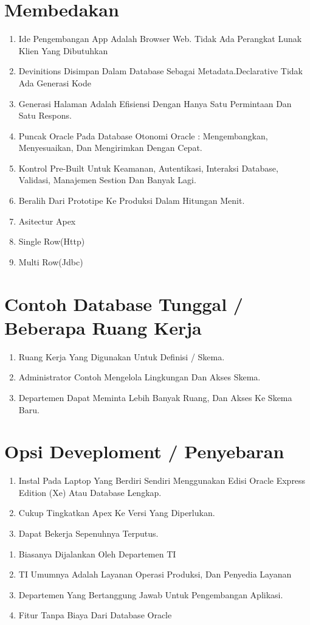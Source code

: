 \documentclass{article}
\begin{document}
\section{Membedakan}
\usepackage{Ciri:}
\begin{enumerate}
    \item Ide Pengembangan App Adalah Browser Web. Tidak Ada Perangkat Lunak Klien Yang Dibutuhkan
\item Devinitions Disimpan Dalam Database Sebagai Metadata.Declarative Tidak Ada Generasi Kode
\item Generasi Halaman Adalah Efisiensi Dengan Hanya Satu Permintaan Dan Satu Respons.
\item Puncak Oracle Pada Database Otonomi Oracle : Mengembangkan, Menyesuaikan, Dan Mengirimkan Dengan Cepat.
\item Kontrol Pre-Built Untuk Keamanan, Autentikasi, Interaksi Database, Validasi, Manajemen Sestion Dan Banyak Lagi.
\item Beralih Dari Prototipe Ke Produksi Dalam Hitungan Menit.
\item Asitectur Apex
\item Single Row(Http)
\item Multi Row(Jdbc)

\end{enumerate}
\section{Contoh Database Tunggal / Beberapa Ruang Kerja}
\begin{enumerate}
    \item Ruang Kerja Yang Digunakan Untuk Definisi / Skema.
\item	Administrator Contoh Mengelola Lingkungan Dan Akses Skema.
\item	Departemen Dapat Meminta Lebih Banyak Ruang, Dan Akses Ke Skema Baru.


\end{enumerate}
\section{Opsi Deveploment / Penyebaran}
\usepackage{Lokal}
\begin{enumerate}
    \item 	Instal Pada Laptop Yang Berdiri Sendiri Menggunakan Edisi Oracle Express Edition (Xe) Atau Database Lengkap.
\item	Cukup Tingkatkan Apex Ke Versi Yang Diperlukan.
\item	Dapat Bekerja Sepenuhnya Terputus.

\end{enumerate}
\usepackage{Di Tempat}
\begin{enumerate}
    \item 	Biasanya Dijalankan Oleh Departemen TI
\item	TI Umumnya Adalah Layanan Operasi Produksi, Dan Penyedia Layanan
\item	Departemen Yang Bertanggung Jawab Untuk Pengembangan Aplikasi.
\item	Fitur Tanpa Biaya Dari Database Oracle

\end{enumerate}
\end{document}
